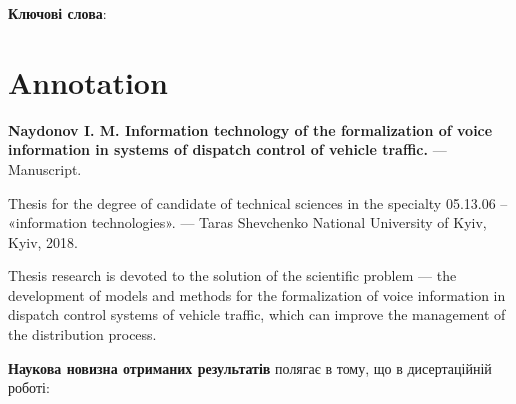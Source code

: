 \textbf{Ключові слова}: \keywords

\chapter*{Annotation}

\textbf{Naydonov I. M. Information technology of the formalization of voice information in systems of dispatch control of vehicle traffic.} --- Manuscript.

Thesis for the degree of candidate of technical sciences in the specialty 05.13.06 -- «information technologies». --- Taras Shevchenko National University of Kyiv, Kyiv, 2018.

Thesis research is devoted to the solution of the scientific problem --- the development of models and methods for the formalization of voice information in dispatch control systems of vehicle traffic, which can improve the management of the distribution process.

%
\textbf{Наукова новизна отриманих результатів} полягає в тому, що в дисертаційній роботі:

